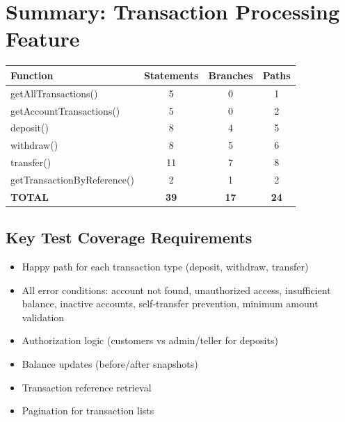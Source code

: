 \section{Summary: Transaction Processing Feature}

\begin{longtable}{|l|c|c|c|}
\hline
\textbf{Function} & \textbf{Statements} & \textbf{Branches} & \textbf{Paths} \\
\hline
getAllTransactions() & 5 & 0 & 1 \\
\hline
getAccountTransactions() & 5 & 0 & 2 \\
\hline
deposit() & 8 & 4 & 5 \\
\hline
withdraw() & 8 & 5 & 6 \\
\hline
transfer() & 11 & 7 & 8 \\
\hline
getTransactionByReference() & 2 & 1 & 2 \\
\hline
\textbf{TOTAL} & \textbf{39} & \textbf{17} & \textbf{24} \\
\hline
\end{longtable}

\subsection{Key Test Coverage Requirements}
\begin{itemize}
    \item Happy path for each transaction type (deposit, withdraw, transfer)
    \item All error conditions: account not found, unauthorized access, insufficient balance, inactive accounts, self-transfer prevention, minimum amount validation
    \item Authorization logic (customers vs admin/teller for deposits)
    \item Balance updates (before/after snapshots)
    \item Transaction reference retrieval
    \item Pagination for transaction lists
\end{itemize}
